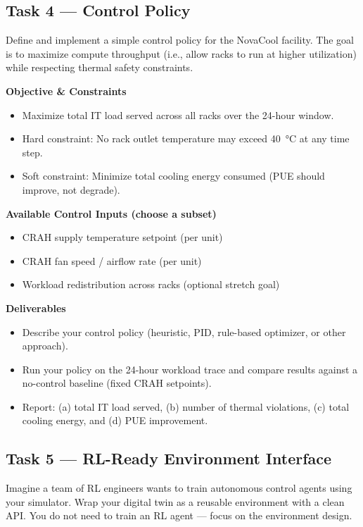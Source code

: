 \documentclass[letterpaper,11pt]{article}
\begin{document}
\subsection{Task 4 — Control Policy}
Define and implement a simple control policy for the NovaCool facility. The goal is to maximize
compute throughput (i.e., allow racks to run at higher utilization) while respecting thermal safety
constraints.

\textbf{Objective \& Constraints}
\begin{itemize}[label=--]
	\item Maximize total IT load served across all racks over the 24-hour window.
	\item Hard constraint: No rack outlet temperature may exceed \qty{40}{\celsius} at any time step.
	\item Soft constraint: Minimize total cooling energy consumed (PUE should improve, not
	degrade).
\end{itemize}

\textbf{Available Control Inputs (choose a subset)}
\begin{itemize}[label=--]
	\item CRAH supply temperature setpoint (per unit)
	\item CRAH fan speed / airflow rate (per unit)
	\item Workload redistribution across racks (optional stretch goal)
\end{itemize}

\textbf{Deliverables}
\begin{itemize}[label=--]
	\item Describe your control policy (heuristic, PID, rule-based optimizer, or other approach).
	\item Run your policy on the 24-hour workload trace and compare results against a no-control
	baseline (fixed CRAH setpoints).
	\item Report: (a) total IT load served, (b) number of thermal violations, (c) total cooling energy, and
	(d) PUE improvement.
\end{itemize}

\subsection{Task 5 — RL-Ready Environment Interface}
Imagine a team of RL engineers wants to train autonomous control agents using your simulator.
Wrap your digital twin as a reusable environment with a clean API. You do not need to train an RL
agent — focus on the environment design.
\end{document}
